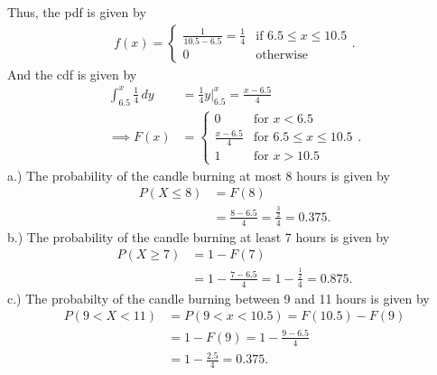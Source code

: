 \documentclass{report}
\begin{document}
 \bigbreak \noindent 
 Thus, the pdf is given by 
 \begin{align*}
     f(x) = 
     \begin{cases}
        \frac{1}{10.5 - 6.5} = \frac{1}{4} & \text{if } 6.5 \leq x \leq 10.5     \\
        0 & \text{otherwise}
     \end{cases}
 .\end{align*}
 \bigbreak \noindent 
 And the cdf is given by
 \begin{align*}
     \int_{6.5}^{x}  \frac{1}{4}\, dy &=\frac{1}{4}y \bigg|^{x}_{6.5} =\frac{x-6.5}{4} \\
     \implies F(x) &= 
     \begin{cases}
         0 & \text{for } x < 6.5 \\
         \frac{x-6.5}{4} & \text{for }    6.5 \leq x \leq 10.5 \\
         1 & \text{for } x > 10.5
     \end{cases}
 .\end{align*}
 \bigbreak \noindent 
 a.) The probability of the candle burning at most 8 hours is given by 
 \begin{align*}
     P(X \leq 8) &= F(8)  \\
     &= \frac{8-6.5}{4} = \frac{\frac{3}{2}}{4}= 0.375
 .\end{align*}
 \bigbreak \noindent 
 b.) The probability of the candle burning at least 7 hours is given by
 \begin{align*}
     P(X \geq 7)  &= 1-F(7) \\
                  &= 1-\frac{7-6.5}{4} = 1-\frac{\frac{1}{2}}{4} = 0.875
 .\end{align*}
 \bigbreak \noindent 
 c.) The probabilty of the candle burning between 9 and 11 hours is given by
 \begin{align*}
     P(9 < X < 11) &= P(9 < x < 10.5) = F(10.5) - F(9) \\
                   &=1-F(9) = 1-\frac{9-6.5}{4} \\
                   &= 1-\frac{2.5}{4} = 0.375
 .\end{align*}
 
\end{document}
